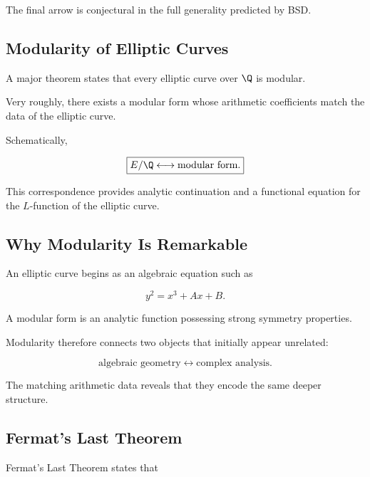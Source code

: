 The final arrow is conjectural in the full generality predicted by BSD.

\subsection{Modularity of Elliptic Curves}
\label{subsec:modularity-arithmetic-geometry}

A major theorem states that every elliptic curve over \(\Q\) is modular.

Very roughly, there exists a modular form whose arithmetic coefficients
match the data of the elliptic curve.

Schematically,

\[ \boxed{E/\Q\longleftrightarrow\text{modular form}.} \]

This correspondence provides analytic continuation and a functional equation
for the \(L\)-function of the elliptic curve.

\subsection{Why Modularity Is Remarkable}
\label{subsec:why-modularity-remarkable}

An elliptic curve begins as an algebraic equation such as

\[ y^2=x^3+Ax+B. \]

A modular form is an analytic function possessing strong symmetry
properties.

Modularity therefore connects two objects that initially appear unrelated:

\[
\boxed{
\text{algebraic geometry}
\longleftrightarrow
\text{complex analysis}.
}
\]

The matching arithmetic data reveals that they encode the same deeper
structure.

\subsection{Fermat's Last Theorem}
\label{subsec:flt-arithmetic-geometry}

Fermat's Last Theorem states that


